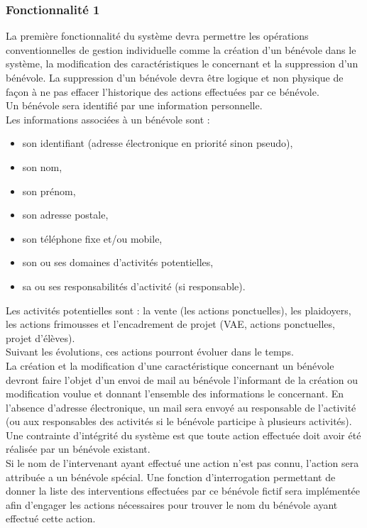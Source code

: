 \subsubsection{Fonctionnalité 1}
La première fonctionnalité du système devra permettre les opérations conventionnelles de gestion individuelle comme la création d'un bénévole dans le système, la modification des caractéristiques le concernant et la suppression d'un bénévole. La suppression d'un bénévole devra être logique et non physique de façon à ne pas effacer l'historique des actions effectuées par ce bénévole. \\
Un bénévole sera identifié par une information personnelle.\\ 
Les informations associées à un bénévole sont :
\begin{itemize}
\item son identifiant (adresse électronique en priorité sinon pseudo),
\item son nom,
\item son prénom,
\item son adresse postale,
\item son téléphone fixe et/ou mobile,
\item son ou ses domaines d'activités potentielles,
\item sa ou ses responsabilités d'activité (si responsable).\\
\end{itemize}

Les activités potentielles sont : la vente (les actions ponctuelles), les plaidoyers, les actions frimousses et l'encadrement de projet (VAE, actions ponctuelles, projet d'élèves).\\
Suivant les évolutions, ces actions pourront évoluer dans le temps. \\ 


La création et la modification d'une caractéristique concernant un bénévole devront faire l'objet d'un envoi de mail au bénévole l'informant de la création ou modification voulue et donnant l'ensemble des informations le concernant. En l'absence d'adresse électronique, un mail sera envoyé au responsable de l'activité (ou aux responsables des activités si le bénévole participe à plusieurs activités).\\


Une contrainte d'intégrité du système est que toute action effectuée doit avoir été réalisée par un bénévole existant. \\
Si le nom de l'intervenant ayant effectué une action n'est pas connu, l'action sera attribuée a un bénévole spécial. Une fonction d'interrogation permettant de donner la liste des interventions effectuées par ce bénévole fictif sera implémentée afin d'engager les actions nécessaires pour trouver le nom du bénévole ayant effectué cette action. \\


